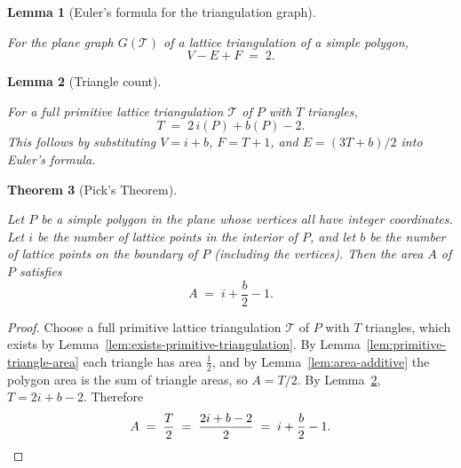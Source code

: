 \documentclass[11pt]{article}
\providecommand{\uses}[1]{}
\providecommand{\lean}[1]{}
\newtheorem{theorem}{Theorem}
\newtheorem{lemma}[theorem]{Lemma}
\theoremstyle{definition}
\begin{document}
\begin{lemma}[Euler's formula for the triangulation graph]
\label{lem:euler-formula}
\lean{Pick.euler_formula}
\uses{def:plane-graph}
For the plane graph $G(\mathcal{T})$ of a lattice triangulation of a simple
polygon,
\[
V - E + F \;=\; 2.
\]
\end{lemma}

\begin{lemma}[Triangle count]
\label{lem:triangle-count}
\lean{Pick.triangle_count}
\uses{lem:vertex-count, lem:face-count, lem:edge-double-count,
lem:euler-formula}
For a full primitive lattice triangulation $\mathcal{T}$ of $P$ with $T$
triangles,
\[
T \;=\; 2\,i(P) + b(P) - 2.
\]
This follows by substituting $V = i+b$, $F = T+1$, and
$E = (3T+b)/2$ into Euler's formula.
\end{lemma}


\begin{theorem}[Pick's Theorem]
\label{thm:pick}
\lean{Pick.pick}
\uses{def:simple-polygon, def:area, def:interior-points, def:boundary-points,
lem:primitive-triangle-area, lem:exists-primitive-triangulation,
lem:area-additive, lem:triangle-count}
Let $P$ be a simple polygon in the plane whose vertices all have integer
coordinates. Let $i$ be the number of lattice points in the interior of $P$,
and let $b$ be the number of lattice points on the boundary of $P$ (including
the vertices). Then the area $A$ of $P$ satisfies
\[
A \;=\; i + \frac{b}{2} - 1.
\]
\end{theorem}

\begin{proof}
Choose a full primitive lattice triangulation $\mathcal{T}$ of $P$ with $T$
triangles, which exists by Lemma~\ref{lem:exists-primitive-triangulation}.
By Lemma~\ref{lem:primitive-triangle-area} each triangle has area $\tfrac12$,
and by Lemma~\ref{lem:area-additive} the polygon area is the sum of triangle
areas, so $A = T/2$. By Lemma~\ref{lem:triangle-count},
$T = 2i + b - 2$. Therefore
\[
A \;=\; \frac{T}{2} \;=\; \frac{2i + b - 2}{2} \;=\; i + \frac{b}{2} - 1.
\qedhere
\]
\end{proof}
\end{document}
